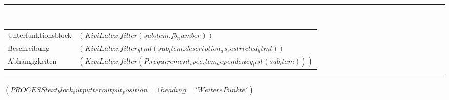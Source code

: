 \documentclass{scrartcl}
\begin{document}
\hspace*{1.15cm}\rule{15.2cm}{0.2pt}\\
\hspace*{1.0cm}%
\parbox[t]{15.0cm}{%
\begin{longtable}{p{2.8cm}p{11.7cm}}
  Unterfunktionsblock & $( KiviLatex.filter(sub_item.fb_number) )$\\
  Beschreibung & $( KiviLatex.filter_html(sub_item.description_as_restricted_html) )$\\
  Abhängigkeiten & $( KiviLatex.filter(P.requirement_spec_item_dependency_list(sub_item)) )$
\end{longtable}}


\vspace{0.2cm}
\hrule
\vspace{0.4cm}


%

$( PROCESS text_block_outputter output_position=1 heading='Weitere Punkte' )$
\end{document}
